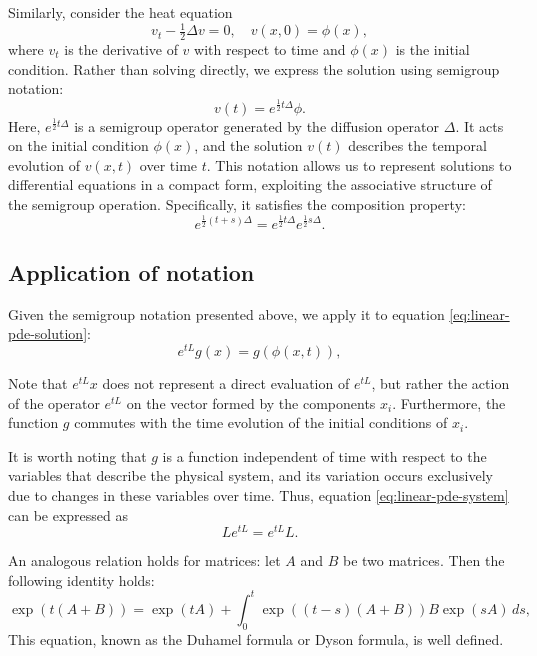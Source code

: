 \documentclass[12pt]{article}
\begin{document}
Similarly, consider the heat equation
\begin{equation*}
	v_t - \tfrac{1}{2}\Delta v = 0, \quad v(x, 0) = \phi(x),
\end{equation*}
where $v_t$ is the derivative of $v$ with respect to time and $\phi(x)$ is the initial condition. Rather than solving directly, we express the solution using semigroup notation:
\begin{equation*}
	v(t) = e^{\tfrac{1}{2}t \Delta} \phi.
\end{equation*}
Here, $e^{\tfrac{1}{2}t \Delta}$ is a semigroup operator generated by the diffusion operator $\Delta$. It acts on the initial condition $\phi(x)$, and the solution $v(t)$ describes the temporal evolution of $v(x,t)$ over time $t$. This notation allows us to represent solutions to differential equations in a compact form, exploiting the associative structure of the semigroup operation. Specifically, it satisfies the composition property:
\begin{equation*}
	e^{\tfrac{1}{2}(t+s)\Delta} = e^{\tfrac{1}{2}t \Delta} e^{\tfrac{1}{2}s \Delta}.
\end{equation*}


\subsection{Application of notation}
Given the semigroup notation presented above, we apply it to equation \eqref{eq:linear-pde-solution}:
\begin{equation}
	e^{tL} g(x) = g(\phi(x,t)),
	\label{eq:linear-pde-solution-semigroup}
\end{equation}

Note that $e^{tL}x$ does not represent a direct evaluation of $e^{tL}$, but rather the action of the operator $e^{tL}$ on the vector formed by the components $x_i$. Furthermore, the function $g$ commutes with the time evolution of the initial conditions of $x_i$.

It is worth noting that $g$ is a function independent of time with respect to the variables that describe the physical system, and its variation occurs exclusively due to changes in these variables over time. Thus, equation \eqref{eq:linear-pde-system} can be expressed as
\begin{equation}
	L e^{tL} = e^{tL} L.
\end{equation}

An analogous relation holds for matrices: let $A$ and $B$ be two matrices. Then the following identity holds:
\begin{equation}
	\exp(t(A+B)) = \exp(tA) + \int_0^t \exp\!\left((t-s)(A+B)\right) B \exp(sA)\, ds,
	\label{eq:duhamel-formula}
\end{equation}
This equation, known as the Duhamel formula or Dyson formula, is well defined.
\end{document}

